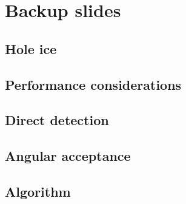 \documentclass[green, 12pt]{beamer}
\begin{document}
   
%
%   
%   
%
   

\appendix
\section{Backup slides}

\subsection{Hole ice}
  

\subsection{Performance considerations}
  
  
  

\subsection{Direct detection}
  

\subsection{Angular acceptance}
  
  

\subsection{Algorithm}
  
\end{document}
